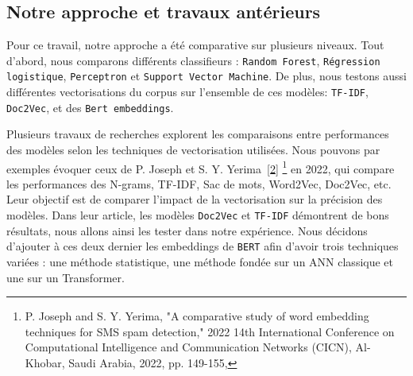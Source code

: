 \subsection{Notre approche et travaux antérieurs}

Pour ce travail, notre approche a été comparative sur plusieurs niveaux. Tout d'abord, nous comparons différents classifieurs : \texttt{Random Forest}, \texttt{Régression logistique}, \texttt{Perceptron} et \texttt{Support Vector Machine}. De plus, nous testons aussi différentes vectorisations du corpus sur l'ensemble de ces modèles: \texttt{TF-IDF}, \texttt{Doc2Vec}, et des \texttt{Bert embeddings}.


\par Plusieurs travaux de recherches explorent les comparaisons entre performances des modèles selon les techniques de vectorisation utilisées. Nous pouvons par exemples évoquer ceux de P. Joseph et S. Y. Yerima~\hyperlink{ref2}{[2]} \footnote{P. Joseph and S. Y. Yerima, "A comparative study of word embedding techniques for SMS spam detection," 2022 14th International Conference on Computational Intelligence and Communication Networks (CICN), Al-Khobar, Saudi Arabia, 2022, pp. 149-155,} en 2022, qui compare les performances des N-grams, TF-IDF, Sac de mots, Word2Vec, Doc2Vec, etc. Leur objectif est de comparer l'impact de la vectorisation sur la précision des modèles. Dans leur article, les modèles \texttt{Doc2Vec} et \texttt{TF-IDF} démontrent de bons résultats, nous allons ainsi les tester dans notre expérience. Nous décidons d'ajouter à ces deux dernier les embeddings de \texttt{BERT} afin d'avoir trois techniques variées : une méthode statistique, une méthode fondée sur un ANN classique et une sur un Transformer.
